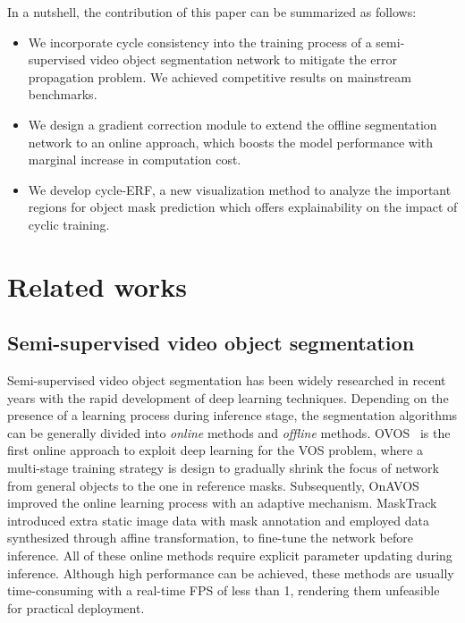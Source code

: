\documentclass{article}
\begin{document}
 In a nutshell, the contribution of this paper can be summarized as follows:
 
 \begin{itemize}
     \item We incorporate cycle consistency into the training process of a semi-supervised video object segmentation network to mitigate the error propagation problem. We achieved competitive results on mainstream benchmarks.
     \item We design a gradient correction module to extend the offline segmentation network to an online approach, which boosts the model performance with marginal increase in computation cost.
     \item We develop cycle-ERF, a new visualization method to analyze the important regions for object mask prediction which offers explainability on the impact of cyclic training.
 \end{itemize}

\section{Related works}
\subsection{Semi-supervised video object segmentation}
 Semi-supervised video object segmentation has been widely researched in recent years with the rapid development of deep learning techniques. Depending on the presence of a learning process during inference stage, the segmentation algorithms can be generally divided into \emph{online} methods and \emph{offline} methods. OVOS~\cite{Cae_OVOS_17} is the first online approach to exploit deep learning for the VOS problem, where a multi-stage training strategy is design to gradually shrink the focus of network from general objects to the one in reference masks. Subsequently, OnAVOS~\cite{voigtlaender17BMVC} improved the online learning process with an adaptive mechanism. MaskTrack ~\cite{Perazzi_2017_CVPR} introduced extra static image data with mask annotation and employed data synthesized through affine transformation, to fine-tune the network before inference. All of these online methods require explicit parameter updating during inference. Although high performance can be achieved, these methods are usually time-consuming with a real-time FPS of less than 1, rendering them unfeasible for practical deployment.
\end{document}
